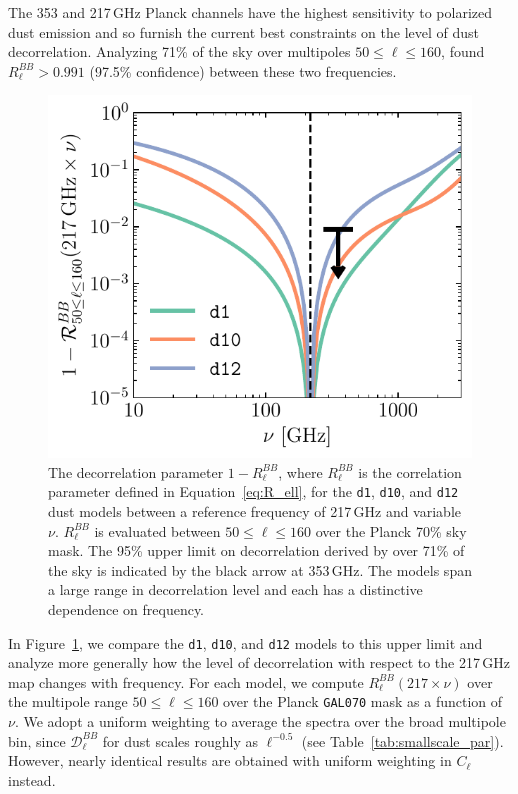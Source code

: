 \documentclass[twocolumn]{aastex631}
\begin{document}
The 353 and 217\,GHz Planck channels have the highest sensitivity to polarized dust emission and so furnish the current best constraints on the level of dust decorrelation. Analyzing 71\% of the sky over multipoles $50 \leq \ell \leq 160$, \citet{planck2016-l11A} found $R_\ell^{BB} > 0.991$ (97.5\% confidence) between these two frequencies.

\begin{figure}
    \centering
    \includegraphics[width=\columnwidth]{figures/decorrelation_dust.pdf}
    \caption{The decorrelation parameter $1-R_\ell^{BB}$, where $R_\ell^{BB}$ is the correlation parameter defined in Equation~\eqref{eq:R_ell}, for the \texttt{d1}, \texttt{d10}, and \texttt{d12} dust models between a reference frequency of 217\,GHz and variable $\nu$. $R_\ell^{BB}$ is evaluated between $50 \leq \ell \leq 160$ over the Planck 70\% sky mask. The 95\% upper limit on decorrelation derived by \citet{planck2016-l11A} over 71\% of the sky is indicated by the black arrow at 353\,GHz. The models span a large range in decorrelation level and each has a distinctive dependence on frequency.}
    \label{fig:decorrelation}
\end{figure}

In Figure~\ref{fig:decorrelation}, we compare the \texttt{d1}, \texttt{d10}, and \texttt{d12} models to this upper limit and analyze more generally how the level of decorrelation with respect to the 217\,GHz map changes with frequency. For each model, we compute $R_\ell^{BB}\left(217\times\nu\right)$ over the multipole range $50 \leq \ell \leq 160$ over the Planck \texttt{GAL070} mask as a function of $\nu$. We adopt a uniform weighting to average the spectra over the broad multipole bin, since $\mathcal{D}_\ell^{BB}$ for dust scales roughly as $\ell^{-0.5}$ (see Table~\ref{tab:smallscale_par}). However, nearly identical results are obtained with uniform weighting in $C_\ell$ instead.
\end{document}
